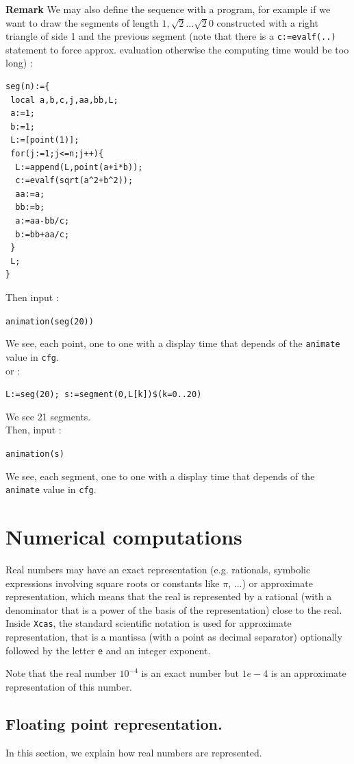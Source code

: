 \documentclass[a4paper,11pt]{book}
\begin{document}
{\bf Remark}
We may also define the sequence with a program, 
for example if we want to draw the
segments of length $1,\sqrt 2...\sqrt 20$ constructed with a 
right triangle of side 1 and the previous segment
(note that there is a {\tt c:=evalf(..)} statement
to force approx. evaluation otherwise the computing time 
would be too long) :
\begin{verbatim}
seg(n):={
 local a,b,c,j,aa,bb,L;
 a:=1;
 b:=1;
 L:=[point(1)];
 for(j:=1;j<=n;j++){
  L:=append(L,point(a+i*b));
  c:=evalf(sqrt(a^2+b^2));
  aa:=a;
  bb:=b;
  a:=aa-bb/c;
  b:=bb+aa/c;
 }
 L;
}
\end{verbatim}
Then input : 
\begin{center}{\tt animation(seg(20))}\end{center}
We see, each point, one to one with a display time that
depends of the {\tt animate} value in {\tt cfg}.\\
or :
\begin{center}{\tt L:=seg(20); s:=segment(0,L[k])\$(k=0..20)}\end{center}
We see 21 segments. \\
Then, input :
\begin{center}{\tt animation(s)}\end{center}
We see, each segment, one to one with a display time that
depends of the {\tt animate} value in {\tt cfg}.



\chapter{Numerical computations}\label{sec:numeric}
Real numbers may have an exact representation
(e.g. rationals, symbolic expressions
involving square roots or constants like $\pi$, ...)
or approximate representation, which means that the real
is represented by a rational (with a denominator that is a power
of the basis of the representation) close to the real.
Inside {\tt Xcas}, the standard scientific notation is used
for approximate representation, that is a mantissa (with a point
as decimal separator) optionally followed by the letter {\tt e}
and an integer exponent.

Note that the real number $10^{-4}$ is an exact number but
$1e-4$ is an approximate representation of this number.

\section{Floating point representation.}
In this section, we explain how real numbers are represented.
\end{document}

